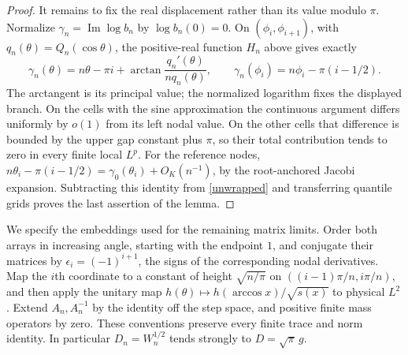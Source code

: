 \documentclass[a4paper,11pt]{amsart}
\theoremstyle{remark}\newtheorem{remark}[theorem]{Remark}
\begin{document}
\begin{proof}
It remains to fix the real displacement rather than its value
modulo $\pi$. Normalize $\gamma_n=\operatorname{Im}\log b_n$ by
$\log b_n(0)=0$. On $(\phi_i,\phi_{i+1})$, with
$q_n(\theta)=Q_n(\cos\theta)$, the positive-real function $H_n$
above gives exactly
\begin{equation}\label{unwrapped}
 \gamma_n(\theta)=n\theta-\pi i+
 \arctan\frac{q_n'(\theta)}{nq_n(\theta)},\qquad
 \gamma_n(\phi_i)=n\phi_i-\pi(i-1/2).
\end{equation}
The arctangent is its principal value; the normalized logarithm
fixes the displayed branch. On the cells with the sine approximation
the continuous argument differs uniformly by $o(1)$ from its left
nodal value. On the other cells that difference is bounded by the
upper gap constant plus $\pi$, so their total contribution tends
to zero in every finite local $L^p$.
For the reference nodes,
$n\theta_i-\pi(i-1/2)=\gamma_0(\theta_i)+O_K(n^{-1})$,
by the root-anchored Jacobi expansion. Subtracting this identity
from \eqref{unwrapped} and transferring quantile grids proves the
last assertion of the lemma.
\end{proof}

We specify the embeddings used for the remaining matrix limits.
Order both arrays in increasing angle, starting with the endpoint
$1$, and conjugate their matrices by
$\epsilon_i=(-1)^{i+1}$, the signs of the corresponding nodal
derivatives. Map the $i$th coordinate to a constant of height
$\sqrt{n/\pi}$ on $((i-1)\pi/n,i\pi/n)$, and then apply the unitary
map $h(\theta)\mapsto h(\arccos x)/\sqrt{s(x)}$ to physical $L^2$.
Extend $A_n,A_n^{-1}$ by the identity off the step space, and positive
finite mass operators by zero. These conventions preserve every
finite trace and norm identity. In particular $D_n=W_n^{1/2}$ tends
strongly to $D=\sqrt\pi\,g$.
\end{document}
